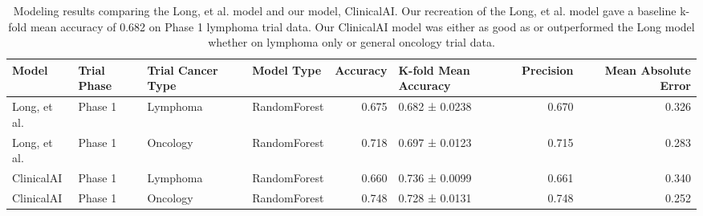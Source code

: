 \begin{table}
\caption{Modeling results comparing the Long, et al. model and our model, ClinicalAI. Our recreation of the Long, et al. model gave a baseline k-fold mean accuracy of 0.682 on Phase 1 lymphoma trial data. Our ClinicalAI model was either as good as or outperformed the Long model whether on lymphoma only or general oncology trial data.}
\label{tab:model_performance}
\begin{tabular}{llllrlrr}
\toprule
Model & Trial Phase & Trial Cancer Type & Model Type & Accuracy & K-fold Mean Accuracy & Precision & Mean Absolute Error \\
\midrule
Long, et al. & Phase 1 & Lymphoma & RandomForest & 0.675 & 0.682 ± 0.0238 & 0.670 & 0.326 \\
Long, et al. & Phase 1 & Oncology & RandomForest & 0.718 & 0.697 ± 0.0123 & 0.715 & 0.283 \\
ClinicalAI & Phase 1 & Lymphoma & RandomForest & 0.660 & 0.736 ± 0.0099 & 0.661 & 0.340 \\
ClinicalAI & Phase 1 & Oncology & RandomForest & 0.748 & 0.728 ± 0.0131 & 0.748 & 0.252 \\
\bottomrule
\end{tabular}
\end{table}
